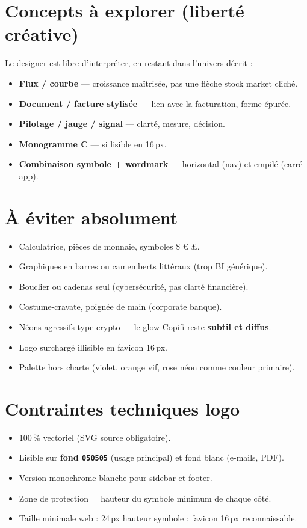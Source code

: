 \documentclass[11pt,a4paper]{report}
\newcommand{\hex}[1]{\texttt{\small #1}}
\begin{document}
\section{Concepts à explorer (liberté créative)}

Le designer est libre d'interpréter, en restant dans l'univers décrit :

\begin{itemize}[leftmargin=*]
    \item \textbf{Flux / courbe} — croissance maîtrisée, pas une flèche stock market cliché.
    \item \textbf{Document / facture stylisée} — lien avec la facturation, forme épurée.
    \item \textbf{Pilotage / jauge / signal} — clarté, mesure, décision.
    \item \textbf{Monogramme C} — si lisible en 16\,px.
    \item \textbf{Combinaison symbole + wordmark} — horizontal (nav) et empilé (carré app).
\end{itemize}

\section{À éviter absolument}

\begin{itemize}[leftmargin=*]
    \item Calculatrice, pièces de monnaie, symboles \$ € £.
    \item Graphiques en barres ou camemberts littéraux (trop BI générique).
    \item Bouclier ou cadenas seul (cybersécurité, pas clarté financière).
    \item Costume-cravate, poignée de main (corporate banque).
    \item Néons agressifs type crypto — le glow Copifi reste \textbf{subtil et diffus}.
    \item Logo surchargé illisible en favicon 16\,px.
    \item Palette hors charte (violet, orange vif, rose néon comme couleur primaire).
\end{itemize}

\section{Contraintes techniques logo}

\begin{itemize}[leftmargin=*]
    \item 100\,\% vectoriel (SVG source obligatoire).
    \item Lisible sur \textbf{fond \hex{050505}} (usage principal) et fond blanc (e-mails, PDF).
    \item Version monochrome blanche pour sidebar et footer.
    \item Zone de protection = hauteur du symbole minimum de chaque côté.
    \item Taille minimale web : 24\,px hauteur symbole ; favicon 16\,px reconnaissable.
\end{itemize}
\end{document}
